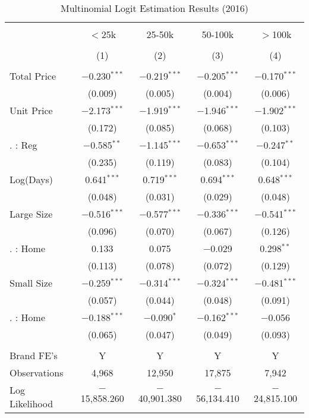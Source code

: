 \begin{table}[!htbp] \centering
  \caption{Multinomial Logit Estimation Results (2016)}
  \label{tab:mlogit2016}
\begin{tabular}{@{\extracolsep{5pt}}lcccc}
\\[-1.8ex]\hline
\hline \\[-1.8ex]
 & $<$25k & 25-50k & 50-100k & $>$100k \\
\\[-1.8ex] & (1) & (2) & (3) & (4)\\
\hline \\[-1.8ex]
 Total Price & $-$0.230$^{***}$ & $-$0.219$^{***}$ & $-$0.205$^{***}$ & $-$0.170$^{***}$ \\
  & (0.009) & (0.005) & (0.004) & (0.006) \\
  Unit Price & $-$2.173$^{***}$ & $-$1.919$^{***}$ & $-$1.946$^{***}$ & $-$1.902$^{***}$ \\
  & (0.172) & (0.085) & (0.068) & (0.103) \\
  . : Reg & $-$0.585$^{**}$ & $-$1.145$^{***}$ & $-$0.653$^{***}$ & $-$0.247$^{**}$ \\
  & (0.235) & (0.119) & (0.083) & (0.104) \\
  Log(Days) & 0.641$^{***}$ & 0.719$^{***}$ & 0.694$^{***}$ & 0.648$^{***}$ \\
  & (0.048) & (0.031) & (0.029) & (0.048) \\
  Large Size & $-$0.516$^{***}$ & $-$0.577$^{***}$ & $-$0.336$^{***}$ & $-$0.541$^{***}$ \\
  & (0.096) & (0.070) & (0.067) & (0.126) \\
  . : Home & 0.133 & 0.075 & $-$0.029 & 0.298$^{**}$ \\
  & (0.113) & (0.078) & (0.072) & (0.129) \\
  Small Size & $-$0.259$^{***}$ & $-$0.314$^{***}$ & $-$0.324$^{***}$ & $-$0.481$^{***}$ \\
  & (0.057) & (0.044) & (0.048) & (0.091) \\
  . : Home & $-$0.188$^{***}$ & $-$0.090$^{*}$ & $-$0.162$^{***}$ & $-$0.056 \\
  & (0.065) & (0.047) & (0.049) & (0.093) \\
 \hline \\[-1.8ex]
Brand FE's & Y & Y & Y & Y \\
Observations & 4,968 & 12,950 & 17,875 & 7,942 \\
Log Likelihood & $-$15,858.260 & $-$40,901.380 & $-$56,134.410 & $-$24,815.100 \\

\end{tabular}
\end{table}
